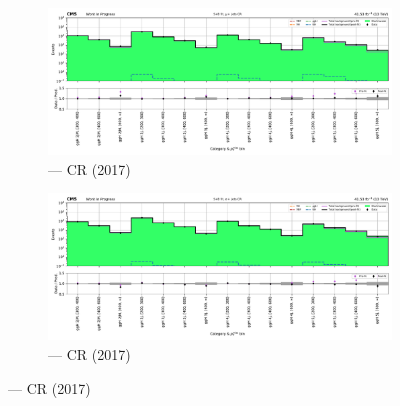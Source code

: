 \begin{figure}[htbp]
    \centering
    \begin{subfigure}[b]{0.49\textwidth}
        \includegraphics[width=\textwidth]{chapters/higgstoinv/figures/mountain_ranges/2017/ggF/Wmunu_tree_fit_s-abs_values_ggF_cats.pdf}
        \caption{\ggH --- \singleMuCr \gls{CR} (2017)}
    \end{subfigure}
    \hfill
    \begin{subfigure}[b]{0.49\textwidth}
        \includegraphics[width=\textwidth]{chapters/higgstoinv/figures/mountain_ranges/2017/ggF/Wenu_tree_fit_s-abs_values_ggF_cats.pdf}
        \caption{\ggH --- \singleEleCr \gls{CR} (2017)}
    \end{subfigure}


\end{figure}
